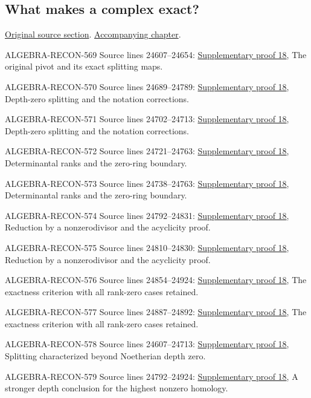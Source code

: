 \subsection{What makes a complex exact?}
\hypertarget{algebra-source-section-complex-exact}{}
\noindent\href{https://github.com/stacks/stacks-project/blob/a04446e57ec1fbc252a871afcec7752fb2807b14/algebra.tex\#L24576}{Original source section}. \href{algebra.pdf\#nameddest=section-complex-exact}{Accompanying chapter}.

\begin{AlgebraSourceRoutes}
\item[ALGEBRA-RECON-569] Source lines 24607--24654: \hyperlink{algebra_complex_exactness_notes_20260928}{Supplementary proof 18}, The original pivot and its exact splitting maps.
\item[ALGEBRA-RECON-570] Source lines 24689--24789: \hyperlink{algebra_complex_exactness_notes_20260928}{Supplementary proof 18}, Depth-zero splitting and the notation corrections.
\item[ALGEBRA-RECON-571] Source lines 24702--24713: \hyperlink{algebra_complex_exactness_notes_20260928}{Supplementary proof 18}, Depth-zero splitting and the notation corrections.
\item[ALGEBRA-RECON-572] Source lines 24721--24763: \hyperlink{algebra_complex_exactness_notes_20260928}{Supplementary proof 18}, Determinantal ranks and the zero-ring boundary.
\item[ALGEBRA-RECON-573] Source lines 24738--24763: \hyperlink{algebra_complex_exactness_notes_20260928}{Supplementary proof 18}, Determinantal ranks and the zero-ring boundary.
\item[ALGEBRA-RECON-574] Source lines 24792--24831: \hyperlink{algebra_complex_exactness_notes_20260928}{Supplementary proof 18}, Reduction by a nonzerodivisor and the acyclicity proof.
\item[ALGEBRA-RECON-575] Source lines 24810--24830: \hyperlink{algebra_complex_exactness_notes_20260928}{Supplementary proof 18}, Reduction by a nonzerodivisor and the acyclicity proof.
\item[ALGEBRA-RECON-576] Source lines 24854--24924: \hyperlink{algebra_complex_exactness_notes_20260928}{Supplementary proof 18}, The exactness criterion with all rank-zero cases retained.
\item[ALGEBRA-RECON-577] Source lines 24887--24892: \hyperlink{algebra_complex_exactness_notes_20260928}{Supplementary proof 18}, The exactness criterion with all rank-zero cases retained.
\item[ALGEBRA-RECON-578] Source lines 24607--24713: \hyperlink{algebra_complex_exactness_notes_20260928}{Supplementary proof 18}, Splitting characterized beyond Noetherian depth zero.
\item[ALGEBRA-RECON-579] Source lines 24792--24924: \hyperlink{algebra_complex_exactness_notes_20260928}{Supplementary proof 18}, A stronger depth conclusion for the highest nonzero homology.
\end{AlgebraSourceRoutes}

